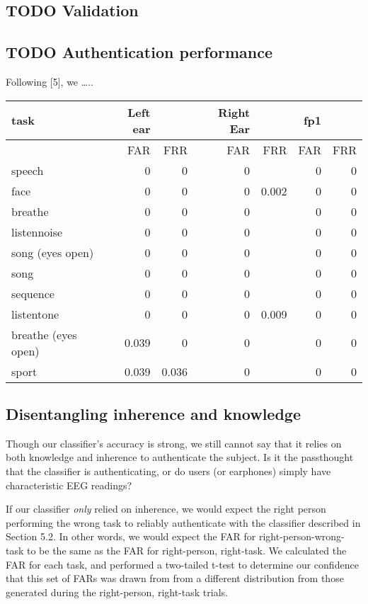 \documentclass[11pt]{article}
\begin{document}
\subsection{{\bfseries\sffamily TODO} Validation}
\label{sec:org9fa2fd6}
\subsection{{\bfseries\sffamily TODO} Authentication performance}
\label{sec:org993972c}

Following [5], we \ldots{}..

\begin{center}
\begin{tabular}{lrrrrrr}
task & Left ear &  & Right Ear &  & fp1 & \\
\hline
 & FAR & FRR & FAR & FRR & FAR & FRR\\
\hline
speech & 0 & 0 & 0 &  & 0 & 0\\
face & 0 & 0 & 0 & 0.002 & 0 & 0\\
breathe & 0 & 0 & 0 &  & 0 & 0\\
listennoise & 0 & 0 & 0 &  & 0 & 0\\
song (eyes open) & 0 & 0 & 0 &  & 0 & 0\\
song & 0 & 0 & 0 &  & 0 & 0\\
sequence & 0 & 0 & 0 &  & 0 & 0\\
listentone & 0 & 0 & 0 & 0.009 & 0 & 0\\
breathe (eyes open) & 0.039 & 0 & 0 &  & 0 & 0\\
sport & 0.039 & 0.036 & 0 &  & 0 & 0\\
\end{tabular}
\end{center}

\subsection{Disentangling inherence and knowledge}
\label{sec:orgec74458}

Though our classifier's accuracy is strong, we still cannot say that it relies 
on both knowledge and inherence to authenticate the subject. Is it the passthought
that the classifier is authenticating, or do users (or earphones) simply have characteristic
EEG readings? 

If our classifier \emph{only} relied on inherence, we would expect the right person performing
the wrong task to reliably authenticate with the classifier described in Section 5.2.
In other words, we would expect the FAR for right-person-wrong-task to be the same 
as the FAR for right-person, right-task. We calculated the FAR for each task, and performed
a two-tailed t-test to determine our confidence that this set of FARs was drawn from
from a different distribution from those generated during the right-person, right-task trials.
\end{document}
